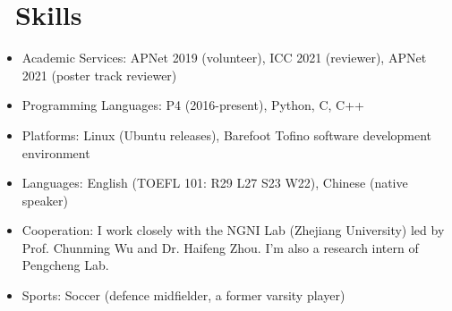 \documentclass{resume}
\begin{document}
\section{\faCogs\ Skills}
\begin{itemize}[parsep=0.5ex]
  \item Academic Services: APNet 2019 (volunteer), ICC 2021 (reviewer), APNet 2021 (poster track reviewer)
  \item Programming Languages: P4 (2016-present), Python, C, C++
  \item Platforms: Linux (Ubuntu releases), Barefoot Tofino software development environment
  \item Languages: English (TOEFL 101: R29 L27 S23 W22), Chinese (native speaker)
  \item Cooperation: I work closely with the NGNI Lab (Zhejiang University) led by Prof. Chunming Wu and Dr. Haifeng Zhou. I'm also a research intern of Pengcheng Lab.
  \item Sports: Soccer (defence midfielder, a former varsity player)
\end{itemize}



\newpage
\end{document}

